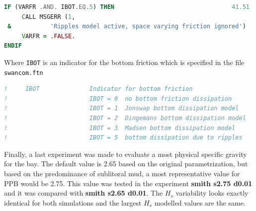 \documentclass[12pt]{article}
\begin{document}
\begin{lstlisting}[language=Fortran]
IF (VARFR .AND. IBOT.EQ.5) THEN                                 41.51
     CALL MSGERR (1,
 &           'Ripples model active, space varying friction ignored')
     VARFR = .FALSE.
ENDIF
\end{lstlisting}

Where \verb|IBOT| is an indicator for the bottom friction which is specified in the file \verb|swancom.ftn|

\begin{lstlisting}[language=Fortran]
!     IBOT              Indicator for bottom friction
!                       IBOT = 0  no bottom friction dissipation
!                       IBOT = 1  Jonswap bottom dissipation model
!                       IBOT = 2  Dingemans bottom dissipation model
!                       IBOT = 3  Madsen bottom dissipation model
!                       IBOT = 5  bottom dissipation due to ripples
\end{lstlisting}
      
Finally, a last experiment was made to evaluate a most physical specific gravity for the bay. The default value is 2.65 based on the original parametrization, but based on the predominance of sublitoral mud, a most representative value for PPB would be 2.75. This value was tested in the experiment \textbf{smith s2.75 d0.01} and it was compared with \textbf{smith s2.65 d0.01}. The $H_s$ variability looks exactly identical for both simulations and the largest $H_s$ modelled values are the same. 
\end{document}
